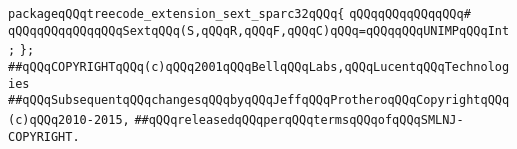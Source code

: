 \newline
\newline
\newline
\newline
\newline
\verb|packageqQQqtreecode_extension_sext_sparc32qQQq{|\newline
\verb|qQQqqQQqqQQqqQQq#|\newline
\verb|qQQqqQQqqQQqqQQqSextqQQq(S,qQQqR,qQQqF,qQQqC)qQQq=qQQqqQQqUNIMPqQQqInt;|\newline
\verb|};|\newline
\newline
\newline
\verb|##qQQqCOPYRIGHTqQQq(c)qQQq2001qQQqBellqQQqLabs,qQQqLucentqQQqTechnologies|\newline
\verb|##qQQqSubsequentqQQqchangesqQQqbyqQQqJeffqQQqProtheroqQQqCopyrightqQQq(c)qQQq2010-2015,|\newline
\verb|##qQQqreleasedqQQqperqQQqtermsqQQqofqQQqSMLNJ-COPYRIGHT.|\newline

